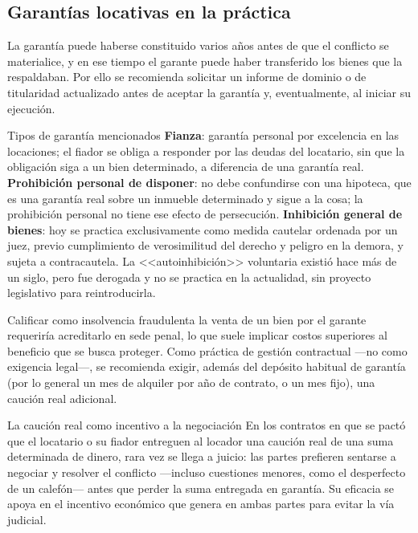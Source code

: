 \documentclass[12pt,oneside]{book}
\begin{document}
\subsection{Garantías locativas en la práctica}

La garantía puede haberse constituido varios años antes de que el conflicto se materialice, y en ese tiempo el garante puede haber transferido los bienes que la respaldaban. Por ello se recomienda solicitar un informe de dominio o de titularidad actualizado antes de aceptar la garantía y, eventualmente, al iniciar su ejecución.

\begin{definition}{Tipos de garantía mencionados}
\textbf{Fianza}: garantía personal por excelencia en las locaciones; el fiador se obliga a responder por las deudas del locatario, sin que la obligación siga a un bien determinado, a diferencia de una garantía real.
\textbf{Prohibición personal de disponer}: no debe confundirse con una hipoteca, que es una garantía real sobre un inmueble determinado y sigue a la cosa; la prohibición personal no tiene ese efecto de persecución.
\textbf{Inhibición general de bienes}: hoy se practica exclusivamente como medida cautelar ordenada por un juez, previo cumplimiento de verosimilitud del derecho y peligro en la demora, y sujeta a contracautela. La <<autoinhibición>> voluntaria existió hace más de un siglo, pero fue derogada y no se practica en la actualidad, sin proyecto legislativo para reintroducirla.
\end{definition}

Calificar como insolvencia fraudulenta la venta de un bien por el garante requeriría acreditarlo en sede penal, lo que suele implicar costos superiores al beneficio que se busca proteger. Como práctica de gestión contractual ---no como exigencia legal---, se recomienda exigir, además del depósito habitual de garantía (por lo general un mes de alquiler por año de contrato, o un mes fijo), una caución real adicional.

\begin{example}{La caución real como incentivo a la negociación}
En los contratos en que se pactó que el locatario o su fiador entreguen al locador una caución real de una suma determinada de dinero, rara vez se llega a juicio: las partes prefieren sentarse a negociar y resolver el conflicto ---incluso cuestiones menores, como el desperfecto de un calefón--- antes que perder la suma entregada en garantía. Su eficacia se apoya en el incentivo económico que genera en ambas partes para evitar la vía judicial.
\end{example}
\end{document}

